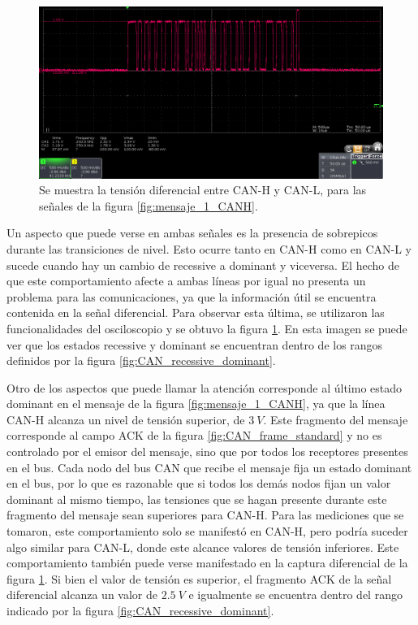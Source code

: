 \begin{figure}[!t]
    \centering
    \includegraphics[width=\textwidth]{img/mensaje_1_diff.png}
    \caption{Se muestra la tensión diferencial entre CAN-H y CAN-L, para las señales de la figura \ref{fig:mensaje_1_CANH}.}
    \label{fig:mensaje_1_diff}
\end{figure}

Un aspecto que puede verse en ambas señales es la presencia de sobrepicos durante las transiciones de nivel. Esto ocurre tanto en CAN-H como en CAN-L y sucede cuando hay un cambio de recessive a dominant y viceversa. El hecho de que este comportamiento afecte a ambas líneas por igual no presenta un problema para las comunicaciones, ya que la información útil se encuentra contenida en la señal diferencial. Para observar esta última, se utilizaron las funcionalidades del osciloscopio y se obtuvo la figura \ref{fig:mensaje_1_diff}. En esta imagen se puede ver que los estados recessive y dominant se encuentran dentro de los rangos definidos por la figura \ref{fig:CAN_recessive_dominant}.

Otro de los aspectos que puede llamar la atención corresponde al último estado dominant en el mensaje de la figura \ref{fig:mensaje_1_CANH}, ya que la línea CAN-H alcanza un nivel de tensión superior, de $3 \ V$. Este fragmento del mensaje corresponde al campo ACK de la figura \ref{fig:CAN_frame_standard} y no es controlado por el emisor del mensaje, sino que por todos los receptores presentes en el bus. Cada nodo del bus CAN que recibe el mensaje fija un estado dominant en el bus, por lo que es razonable que si todos los demás nodos fijan un valor dominant al mismo tiempo, las tensiones que se hagan presente durante este fragmento del mensaje sean superiores para CAN-H. Para las mediciones que se tomaron, este comportamiento solo se manifestó en CAN-H, pero podría suceder algo similar para CAN-L, donde este alcance valores de tensión inferiores. Este comportamiento también puede verse manifestado en la captura diferencial de la figura \ref{fig:mensaje_1_diff}. Si bien el valor de tensión es superior, el fragmento ACK de la señal diferencial alcanza un valor de $2.5 \ V$ e igualmente se encuentra dentro del rango indicado por la figura \ref{fig:CAN_recessive_dominant}.

